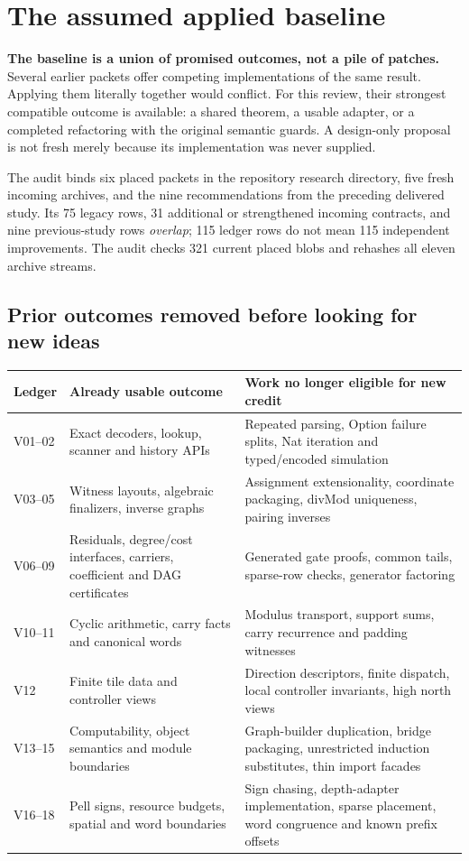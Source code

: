 \section{The assumed applied baseline}

\textbf{The baseline is a union of promised outcomes, not a pile of patches.} Several earlier packets offer competing implementations of the same result. Applying them literally together would conflict. For this review, their strongest compatible outcome is available: a shared theorem, a usable adapter, or a completed refactoring with the original semantic guards. A design-only proposal is not fresh merely because its implementation was never supplied.

The audit binds six placed packets in the repository research directory, five fresh incoming archives, and the nine recommendations from the preceding delivered study. Its 75 legacy rows, 31 additional or strengthened incoming contracts, and nine previous-study rows \emph{overlap}; 115 ledger rows do not mean 115 independent improvements. The audit checks 321 current placed blobs and rehashes all eleven archive streams.

\subsection{Prior outcomes removed before looking for new ideas}

\begin{tabularx}{\linewidth}{@{}L{0.60in}L{1.66in}Y@{}}
\toprule
Ledger & Already usable outcome & Work no longer eligible for new credit \\
\midrule
V01--02 & Exact decoders, lookup, scanner and history APIs & Repeated parsing, Option failure splits, Nat iteration and typed/encoded simulation \\
V03--05 & Witness layouts, algebraic finalizers, inverse graphs & Assignment extensionality, coordinate packaging, divMod uniqueness, pairing inverses \\
V06--09 & Residuals, degree/cost interfaces, carriers, coefficient and DAG certificates & Generated gate proofs, common tails, sparse-row checks, generator factoring \\
V10--11 & Cyclic arithmetic, carry facts and canonical words & Modulus transport, support sums, carry recurrence and padding witnesses \\
V12 & Finite tile data and controller views & Direction descriptors, finite dispatch, local controller invariants, high north views \\
V13--15 & Computability, object semantics and module boundaries & Graph-builder duplication, bridge packaging, unrestricted induction substitutes, thin import facades \\
V16--18 & Pell signs, resource budgets, spatial and word boundaries & Sign chasing, depth-adapter implementation, sparse placement, word congruence and known prefix offsets \\
\bottomrule
\end{tabularx}

